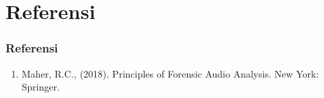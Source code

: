 \documentclass[pdflatex,compress]{beamer}
\begin{document}
\section{Referensi}

\begin{frame}
	\frametitle{Referensi}
	\begin{enumerate}
		\item Maher, R.C., (2018). Principles of Forensic Audio Analysis. New York: Springer.
	\end{enumerate}
\end{frame}
\end{document}
